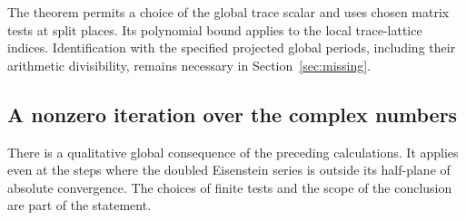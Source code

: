 \documentclass[a4paper,11pt]{article}
\theoremstyle{definition}
\theoremstyle{remark}
\numberwithin{equation}{section}
\begin{document}
The theorem permits a choice of the global trace scalar
and uses chosen matrix tests at split places. Its
polynomial bound applies to the local trace-lattice indices.
Identification with the specified projected global periods,
including their arithmetic divisibility, remains necessary
in Section~\ref{sec:missing}.

\subsection{A nonzero iteration over the complex numbers}\label{nav:VIII-21}
There is a qualitative global consequence of the preceding
calculations. It applies even at the steps where the doubled
Eisenstein series is outside its half-plane of absolute
convergence. The choices of finite tests and the scope of
the conclusion are part of the statement.
\end{document}
